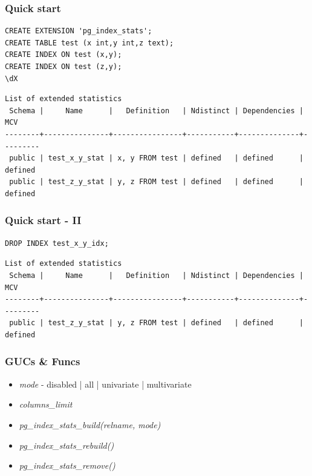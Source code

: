 \documentclass[xcolor=table]{beamer}
\begin{document}
\begin{frame}[fragile]\frametitle{Quick start}
\begin{lstlisting}[basicstyle=\footnotesize]
CREATE EXTENSION 'pg_index_stats';
CREATE TABLE test (x int,y int,z text);
CREATE INDEX ON test (x,y);
CREATE INDEX ON test (z,y);
\dX
\end{lstlisting}
\begin{lstlisting}[basicstyle=\tiny]
                         List of extended statistics
 Schema |     Name      |   Definition   | Ndistinct | Dependencies |   MCV   
--------+---------------+----------------+-----------+--------------+---------
 public | test_x_y_stat | x, y FROM test | defined   | defined      | defined
 public | test_z_y_stat | y, z FROM test | defined   | defined      | defined
\end{lstlisting}
\end{frame}

\begin{frame}[fragile]\frametitle{Quick start - II}
\begin{lstlisting}[basicstyle=\footnotesize]
DROP INDEX test_x_y_idx;
\end{lstlisting}
\begin{lstlisting}[basicstyle=\tiny]
                         List of extended statistics
 Schema |     Name      |   Definition   | Ndistinct | Dependencies |   MCV   
--------+---------------+----------------+-----------+--------------+---------
 public | test_z_y_stat | y, z FROM test | defined   | defined      | defined
\end{lstlisting}
\end{frame}


\begin{frame}[fragile]\frametitle{GUCs \& Funcs}
\begin{itemize}
  \item \textit{mode} - disabled | all | univariate | multivariate
  \item \textit{columns\_limit}
  \item \textit{pg\_index\_stats\_build(relname, mode)}
  \item \textit{pg\_index\_stats\_rebuild()}
  \item \textit{pg\_index\_stats\_remove()}
\end{itemize}
\end{frame}
\end{document}
